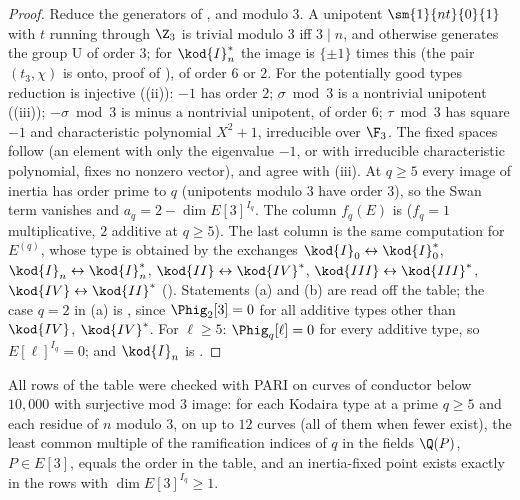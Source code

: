 \begin{proof}
Reduce the generators of ,  and  modulo $3$. A unipotent
$\sm{1}{nt}{0}{1}$ with $t$ running through $\Z_3$ is trivial modulo $3$ iff $3\mid n$, and otherwise generates the group $\mathrm U$ of order $3$; for $\kod{I}_n^*$ the
image is $\{\pm1\}$ times this (the pair $(t_3,\chi)$ is onto, proof of ), of order $6$ or $2$. For the potentially good types
reduction is injective ((ii)): $-1$ has order $2$; $\sigma\bmod3$ is a nontrivial unipotent ((iii)); $-\sigma\bmod3$ is
minus a nontrivial unipotent, of order $6$; $\tau\bmod3$ has square $-1$ and characteristic polynomial $X^2+1$, irreducible over $\F_3$. The fixed spaces
follow (an element with only the eigenvalue $-1$, or with irreducible characteristic polynomial, fixes no nonzero vector), and agree with
(iii). At $q\ge5$ every image of inertia has order prime to $q$ (unipotents modulo $3$ have order $3$), so the Swan
term vanishes and $a_q=2-\dim E[3]^{I_q}$. The column $f_q(E)$ is  ($f_q=1$ multiplicative, $2$ additive at $q\ge5$). The last
column is the same computation for $E^{(q)}$, whose type is obtained by the exchanges $\kod{I}_0\leftrightarrow\kod{I}_0^*$, $\kod{I}_n\leftrightarrow\kod{I}_n^*$,
$\kod{II}\leftrightarrow\kod{IV}^*$, $\kod{III}\leftrightarrow\kod{III}^*$, $\kod{IV}\leftrightarrow\kod{II}^*$ (). Statements (a) and (b) are read off the table;
the case $q=2$ in (a) is , since $\Phig_2[3]=0$ for all additive types other than $\kod{IV}$, $\kod{IV}^*$. For $\ell\ge5$:
$\Phig_q[\ell]=0$ for every additive type, so $E[\ell]^{I_q}=0$; and $\kod{I}_n$ is .
\end{proof}

All rows of the table were checked with PARI on curves of conductor below $10{,}000$ with surjective mod $3$ image: for each Kodaira type at a
prime $q\ge5$ and each residue of $n$ modulo $3$, on up to $12$ curves (all of them when fewer exist), the least common multiple of the
ramification indices of $q$ in the fields $\Q(P)$, $P\in E[3]$, equals the order in the table, and an inertia-fixed point exists exactly in the
rows with $\dim E[3]^{I_q}\ge1$.

